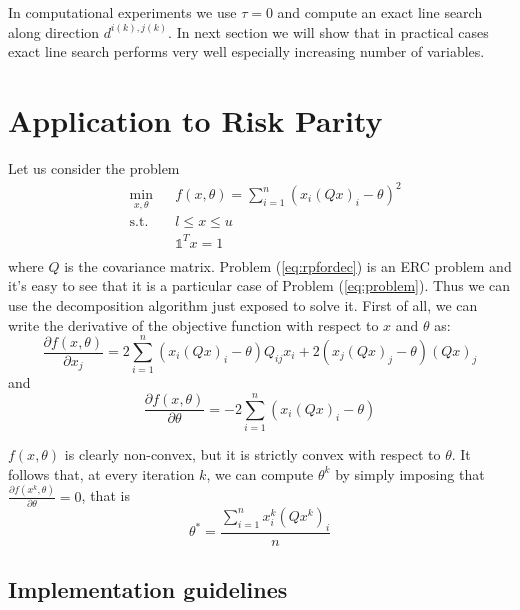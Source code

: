 \begin{oss}
In computational experiments we use $\tau = 0$ and compute an exact line search along direction $d^{i(k),j(k)}$. In next section we will show that in practical cases exact line search performs very well especially increasing number of variables.
\end{oss}

\section{Application to Risk Parity}
Let us consider the problem
\begin{equation}\label{eq:rpfordec}
\begin{aligned}
& \underset{x, \theta}{\text{min}}
&&f(x,\theta)=\sum_{i=1}^n \left(x_i (Q x)_i - \theta\right)^2\\
& \text{s.t.}
&& l \leq x \leq u\\
&&& \mathds{1}^T x = 1 \\
\end{aligned}
\end{equation}
where $Q$ is the covariance matrix. Problem (\ref{eq:rpfordec}) is an ERC problem and it's easy to see that it is a particular case of Problem (\ref{eq:problem}). Thus we can use the decomposition algorithm just exposed to solve it. First of all, we can write the derivative of the objective function with respect to $x$ and $\theta$ as:
\begin{equation}\label{eq:gradxdec}
\frac{\partial f(x,\theta)}{\partial x_j} = 2 \sum_{i=1}^n \left(x_i (Q x)_i - \theta\right)Q_{ij}x_i + 2(x_j (Q x)_j - \theta)(Q x)_j
\end{equation}
and
\begin{equation}\label{eq:gradthetadec}
\frac{\partial f(x,\theta)}{\partial \theta}= -2\sum_{i=1}^n \left(x_i (Q x)_i - \theta\right)
\end{equation}

$f(x,\theta)$ is clearly non-convex, but it is strictly convex with respect to $\theta$. It follows that, at every iteration $k$, we can compute $\theta^{k}$ by simply imposing that $\frac{\partial f(x^{k},\theta)}{\partial \theta} =0$, that is
\begin{equation}\label{eq:theta}
\theta^* = \frac{\sum_{i=1}^n x_i^{k} (Q x^{k})_i}{n}
\end{equation} 

\subsection{Implementation guidelines}
